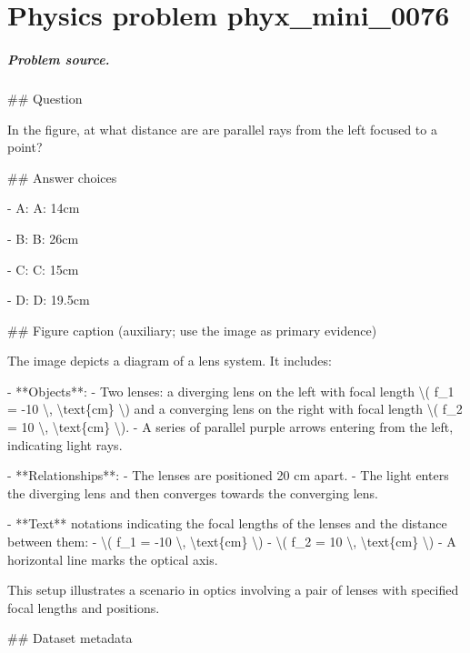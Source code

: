 
\chapter{Physics problem phyx\_mini\_0076}
\label{ch:PhyXMiniProblems_problem_phyx_mini_0076}

\paragraph{Problem source.}
\#\# Question

In the figure, at what distance are are parallel rays from the left focused to a point?

\#\# Answer choices

- A: A: 14cm

- B: B: 26cm

- C: C: 15cm

- D: D: 19.5cm

\#\# Figure caption (auxiliary; use the image as primary evidence)

The image depicts a diagram of a lens system. It includes:

- **Objects**:
  - Two lenses: a diverging lens on the left with focal length \textbackslash{}( f\_1 = -10 \textbackslash{}, \textbackslash{}text\{cm\} \textbackslash{}) and a converging lens on the right with focal length \textbackslash{}( f\_2 = 10 \textbackslash{}, \textbackslash{}text\{cm\} \textbackslash{}).
  - A series of parallel purple arrows entering from the left, indicating light rays.

- **Relationships**:
  - The lenses are positioned 20 cm apart.
  - The light enters the diverging lens and then converges towards the converging lens.

- **Text** notations indicating the focal lengths of the lenses and the distance between them:
  - \textbackslash{}( f\_1 = -10 \textbackslash{}, \textbackslash{}text\{cm\} \textbackslash{})
  - \textbackslash{}( f\_2 = 10 \textbackslash{}, \textbackslash{}text\{cm\} \textbackslash{})
  - A horizontal line marks the optical axis.

This setup illustrates a scenario in optics involving a pair of lenses with specified focal lengths and positions.

\#\# Dataset metadata

